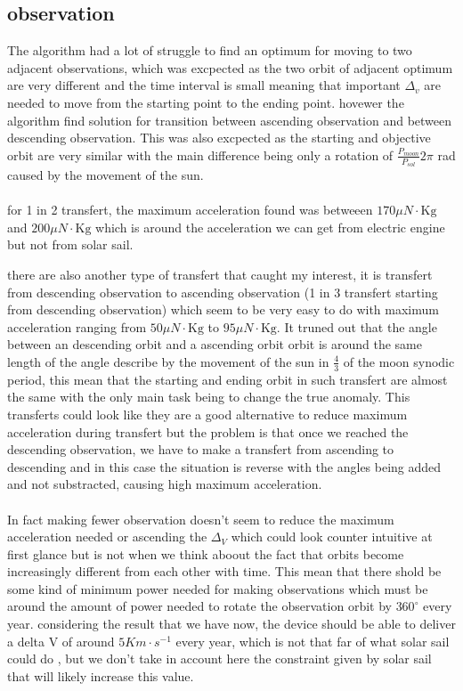 \documentclass{article} %
\begin{document}
			\subsection{observation}
			The algorithm had a lot of struggle to find an optimum for moving to two adjacent observations, which was excpected as the two orbit of adjacent optimum are very different and the time interval is small meaning that important $\Delta_v$ are needed to move from the starting point to the ending point. hovewer the algorithm find solution for transition between ascending observation and between descending observation. This was also excpected as the starting and objective orbit are very similar with the main difference being only a rotation of $\frac{P_{moon}}{P_{sol}}2\pi $ rad caused by the movement of the sun.
			\\ \\
			for 1 in 2 transfert, the maximum acceleration found was betweeen $170 \mu{N}\cdot\text{Kg}$ and $200 \mu{N}\cdot\text{Kg}$ which is around the acceleration we can get from electric engine but not from solar sail.
		
			there are also another type of transfert that caught my interest, it is transfert from descending observation to ascending observation (1 in 3 transfert starting from descending observation) which seem to be very easy to do with maximum acceleration ranging from  $50 \mu{N}\cdot\text{Kg}$ to $95 \mu{N}\cdot\text{Kg}$. It truned out that the angle between an descending orbit and a ascending orbit orbit is around the same length of the angle describe by the movement of the sun in $\frac{4}{3}$ of the moon synodic period, this mean that the starting and ending orbit in such transfert are almost the same with the only main task being to change the true anomaly. This transferts could look like they are a good alternative to reduce maximum acceleration during transfert but the problem is that once we reached the descending observation, we have to make a transfert from ascending to descending and in this case the situation is reverse with the angles being added and not substracted, causing high maximum acceleration.
			\\ \\
			In fact making fewer observation doesn't seem to reduce the maximum acceleration needed or ascending the $\Delta_{V}$ which could look counter intuitive at first glance but is not when we think aboout the fact that orbits become increasingly different from each other with time. This mean that there shold be some kind of minimum power needed for making observations which must be around the amount of power needed to rotate the observation orbit by $360^\circ$ every year. considering the result that we have now, the device should be able to deliver a delta V of around $5Km\cdot s^{-1} $ every year, which is not that far of what solar sail could do , but we don't take in account here the constraint given by solar sail that will likely increase this value.
			
\end{document}
